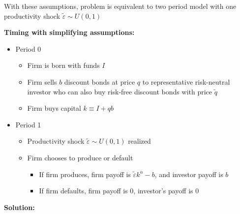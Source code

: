 \documentclass{article}
\begin{document}
With these assumptions, problem is equivalent to two period model with one productivity shock $\tilde \varepsilon \sim U(0,1)$

\smallskip

\textbf{Timing with simplifying assumptions:}

\begin{itemize}
\item Period 0
\begin{itemize}
\item Firm is born with funds $I$
\item Firm sells $b$ discount bonds at price $q$ to representative risk-neutral investor who can also buy risk-free discount bonds with price $\tilde q$
\item Firm buys capital $k \equiv I + q b$ 
\end{itemize}
\item Period 1
\begin{itemize}
\item Productivity shock $\tilde \varepsilon \sim U(0,1)$ realized
\item Firm chooses to produce or default
\begin{itemize}
\item If firm produces, firm payoff is $\tilde \varepsilon k^\alpha - b$, and investor payoff is $b$
\item If firm defaults, firm payoff is 0, investor's payoff is 0
\end{itemize}
\end{itemize}
\end{itemize}

\textbf{Solution:}
\end{document}
